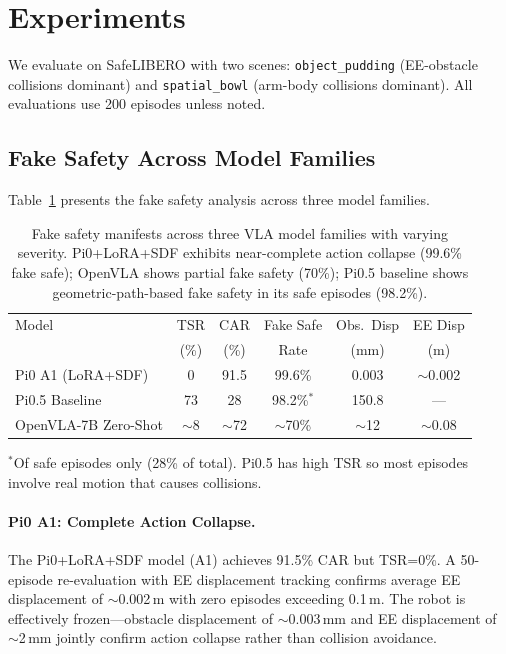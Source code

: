 \documentclass[10pt,twocolumn]{article}
\begin{document}
\section{Experiments}
\label{sec:experiments}

We evaluate on SafeLIBERO with two scenes: \texttt{object\_pudding} (EE-obstacle collisions dominant) and \texttt{spatial\_bowl} (arm-body collisions dominant). All evaluations use 200 episodes unless noted.

\subsection{Fake Safety Across Model Families}
\label{sec:fake_safety}

Table~\ref{tab:fake_safety} presents the fake safety analysis across three model families.

\begin{table}[h]
\centering
\caption{Fake safety manifests across three VLA model families with varying severity. Pi0+LoRA+SDF exhibits near-complete action collapse (99.6\% fake safe); OpenVLA shows partial fake safety (70\%); Pi0.5 baseline shows geometric-path-based fake safety in its safe episodes (98.2\%).}
\label{tab:fake_safety}
\small
\begin{tabular}{lccccc}
\toprule
Model & TSR & CAR & Fake Safe & Obs.\ Disp & EE Disp \\
 & (\%) & (\%) & Rate & (mm) & (m) \\
\midrule
Pi0 A1 (LoRA+SDF) & 0 & 91.5 & 99.6\% & 0.003 & $\sim$0.002 \\
Pi0.5 Baseline & 73 & 28 & 98.2\%$^*$ & 150.8 & --- \\
OpenVLA-7B Zero-Shot & $\sim$8 & $\sim$72 & $\sim$70\% & $\sim$12 & $\sim$0.08 \\
\bottomrule
\end{tabular}
\vspace{1mm}
\footnotesize{$^*$Of safe episodes only (28\% of total). Pi0.5 has high TSR so most episodes involve real motion that causes collisions.}
\end{table}

\paragraph{Pi0 A1: Complete Action Collapse.}
The Pi0+LoRA+SDF model (A1) achieves 91.5\% CAR but TSR=0\%. A 50-episode re-evaluation with EE displacement tracking confirms average EE displacement of $\sim$0.002\,m with zero episodes exceeding 0.1\,m. The robot is effectively frozen---obstacle displacement of $\sim$0.003\,mm and EE displacement of $\sim$2\,mm jointly confirm action collapse rather than collision avoidance.
\end{document}
